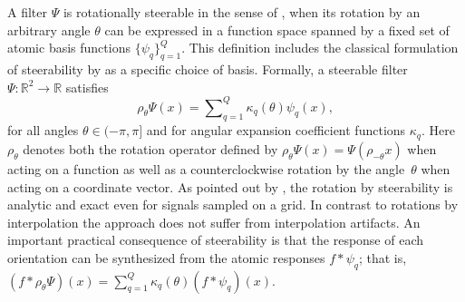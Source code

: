 \documentclass[10pt,twocolumn,letterpaper]{article}
\newcommand{\R}{\mathbb{R}}
\begin{document}
A filter $\Psi$ is rotationally steerable in the sense of \citet{hel1998canonical}, when its rotation by an arbitrary angle $\theta$ can be expressed in a function space spanned by a fixed set of atomic basis functions $\{\psi_q\}_{q=1}^Q.$
This definition includes the classical formulation of steerability by \citet{freeman1991design} as a specific choice of basis.
Formally, a steerable filter $\Psi:\R^2\to\R$ satisfies
\begin{equation}\label{eq:steerabilityGeneralized}
	\rho_\theta \Psi(x) = \sum\nolimits_{q=1}^{Q} \kappa_q(\theta) \psi_q(x),
\end{equation}
for all angles $\theta\in(-\pi,\pi]$ and for angular expansion coefficient functions $\kappa_q$.
Here $\rho_\theta$ denotes both the rotation operator defined by $\rho_\theta \Psi(x) = \Psi(\rho_{-\theta}x)$ when acting on a function as well as a counterclockwise rotation by the angle~$\theta$ when acting on a coordinate vector.
As pointed out by \citet{freeman1991design}, the rotation by steerability is analytic and exact even for signals sampled on a grid.
In contrast to rotations by interpolation the approach does not suffer from interpolation artifacts.
An important practical consequence of steerability is that the response of each orientation can be synthesized from the atomic responses $f\ast\psi_q$; that is,
$
	\left(f \ast \rho_\theta \Psi\right)(x) = \sum\nolimits_{q=1}^{Q} \kappa_q(\theta) \left(f \ast \psi_q\right)(x).
$
\end{document}
